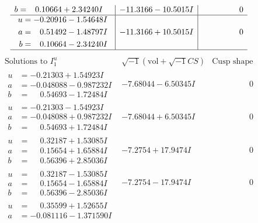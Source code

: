 \documentclass[1p]{elsarticle_modified}
\theoremstyle{definition}
\newcommand{\I}{\sqrt{-1}}
\begin{document}
$$\begin{array}{c|c|c}
\begin{aligned}
b &= \phantom{-}0.10664 + 2.34240 I\end{aligned}
 & -11.3166 - 10.5015 I & \phantom{-0.000000 } 0 \\ \hline\begin{aligned}
u &= -0.20916 - 1.54648 I \\
a &= \phantom{-}0.51492 - 1.48797 I \\
b &= \phantom{-}0.10664 - 2.34240 I\end{aligned}
 & -11.3166 + 10.5015 I & \phantom{-0.000000 } 0\\
 \hline 
 \end{array}$$\newpage$$\begin{array}{c|c|c}  
\text{Solutions to }I^u_{1}& \I (\text{vol} + \sqrt{-1}CS) & \text{Cusp shape}\\
 \hline 
\begin{aligned}
u &= -0.21303 + 1.54923 I \\
a &= -0.048088 - 0.987232 I \\
b &= \phantom{-}0.54693 - 1.72484 I\end{aligned}
 & -7.68044 - 6.50345 I & \phantom{-0.000000 } 0 \\ \hline\begin{aligned}
u &= -0.21303 - 1.54923 I \\
a &= -0.048088 + 0.987232 I \\
b &= \phantom{-}0.54693 + 1.72484 I\end{aligned}
 & -7.68044 + 6.50345 I & \phantom{-0.000000 } 0 \\ \hline\begin{aligned}
u &= \phantom{-}0.32187 + 1.53085 I \\
a &= \phantom{-}0.15654 + 1.65884 I \\
b &= \phantom{-}0.56396 + 2.85036 I\end{aligned}
 & -7.2754 + 17.9474 I & \phantom{-0.000000 } 0 \\ \hline\begin{aligned}
u &= \phantom{-}0.32187 - 1.53085 I \\
a &= \phantom{-}0.15654 - 1.65884 I \\
b &= \phantom{-}0.56396 - 2.85036 I\end{aligned}
 & -7.2754 - 17.9474 I & \phantom{-0.000000 } 0 \\ \hline\begin{aligned}
u &= \phantom{-}0.35599 + 1.52655 I \\
a &= -0.081116 - 1.371590 I \\

\end{aligned}
\end{array}$$
\end{document}
